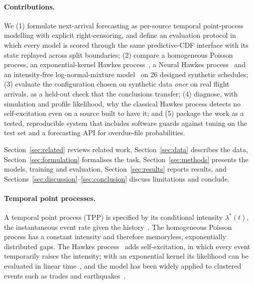 \documentclass[10pt,twocolumn]{article}
\makeatletter
\renewcommand\section{\@startsection{section}{1}{\z@}{-2.2ex plus -0.5ex minus -0.2ex}{1.0ex plus 0.2ex}{\normalfont\Large\bfseries}}
\makeatother
\begin{document}
\paragraph{Contributions.} We (1) formulate next-arrival forecasting as per-source temporal
point-process modelling with explicit right-censoring, and define an evaluation protocol in which
every model is scored through the same predictive-CDF interface with its state replayed across split
boundaries; (2) compare a homogeneous Poisson process, an exponential-kernel Hawkes
process~\citep{hawkes1971spectra}, a Neural Hawkes process~\citep{mei2017neural} and an
intensity-free log-normal-mixture model~\citep{shchur2020intensity} on 26 designed synthetic
schedules; (3) evaluate the configuration chosen on synthetic data \emph{once} on real flight
arrivals, as a held-out check that the conclusions transfer; (4) diagnose, with simulation and profile likelihood, why the classical
Hawkes process detects no self-excitation even on a source built to have it; and (5) package the
work as a tested, reproducible system that includes software guards against tuning on the test set
and a forecasting API for overdue-file probabilities.

Section~\ref{sec:related} reviews related work, Section~\ref{sec:data} describes the data,
Section~\ref{sec:formulation} formalises the task, Section~\ref{sec:methods} presents the models,
training and evaluation, Section~\ref{sec:results} reports results, and
Sections~\ref{sec:discussion}--\ref{sec:conclusion} discuss limitations and conclude.

\section{Related Work}\label{sec:related}
\paragraph{Temporal point processes.} A temporal point process (TPP) is specified by its conditional
intensity $\lambda^*(t)$, the instantaneous event rate given the history~\citep{daley2003introduction}.
The homogeneous Poisson process has a constant intensity and therefore memoryless, exponentially
distributed gaps. The Hawkes process~\citep{hawkes1971spectra} adds self-excitation, in which every
event temporarily raises the intensity; with an exponential kernel its likelihood can be evaluated in
linear time~\citep{ozaki1979maximum}, and the model has been widely applied to clustered events such
as trades and earthquakes~\citep{bacry2015hawkes,laub2015hawkes}.
\end{document}
